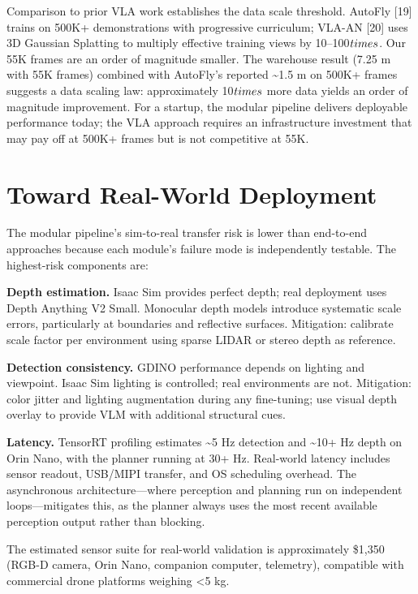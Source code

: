 \documentclass[conference]{IEEEtran}
\begin{document}
Comparison to prior VLA work establishes the data scale threshold.
AutoFly [19] trains on 500K+ demonstrations with progressive
curriculum; VLA-AN [20] uses 3D Gaussian Splatting to multiply
effective training views by 10--100$\\times$. Our 55K frames are an order of
magnitude smaller. The warehouse result (7.25 m with 55K frames)
combined with AutoFly's reported \textasciitilde1.5 m on 500K+ frames
suggests a data scaling law: approximately 10$\\times$ more data yields an order
of magnitude improvement. For a startup, the modular pipeline delivers
deployable performance today; the VLA approach requires an
infrastructure investment that may pay off at 500K+ frames but is not
competitive at 55K.

\section{Toward Real-World Deployment}\label{viii.-toward-real-world-deployment}

The modular pipeline's sim-to-real transfer risk is lower than
end-to-end approaches because each module's failure mode is
independently testable. The highest-risk components are:

\textbf{Depth estimation.} Isaac Sim provides perfect depth; real
deployment uses Depth Anything V2 Small. Monocular depth models
introduce systematic scale errors, particularly at boundaries and
reflective surfaces. Mitigation: calibrate scale factor per environment
using sparse LIDAR or stereo depth as reference.

\textbf{Detection consistency.} GDINO performance depends on lighting
and viewpoint. Isaac Sim lighting is controlled; real environments are
not. Mitigation: color jitter and lighting augmentation during any
fine-tuning; use visual depth overlay to provide VLM with additional
structural cues.

\textbf{Latency.} TensorRT profiling estimates \textasciitilde5 Hz
detection and \textasciitilde10+ Hz depth on Orin Nano, with the planner
running at 30+ Hz. Real-world latency includes sensor readout, USB/MIPI
transfer, and OS scheduling overhead. The asynchronous
architecture---where perception and planning run on independent
loops---mitigates this, as the planner always uses the most recent
available perception output rather than blocking.

The estimated sensor suite for real-world validation is approximately
\$1,350 (RGB-D camera, Orin Nano, companion computer, telemetry),
compatible with commercial drone platforms weighing \textless5 kg.
\end{document}
